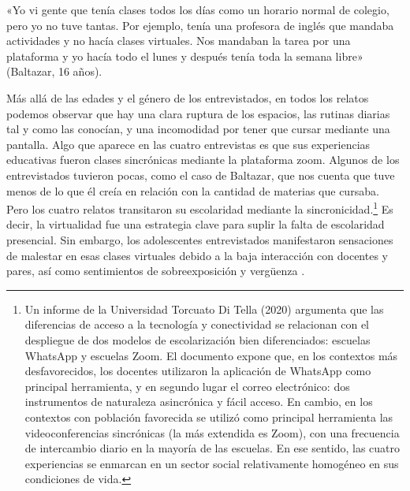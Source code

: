 \begin{refsection}
\begin{gbcita}
«Yo vi gente que tenía clases todos los días como un horario normal de colegio, pero yo no tuve tantas. Por ejemplo, tenía una profesora de inglés que mandaba actividades y no hacía clases virtuales. Nos mandaban la tarea por una plataforma y yo hacía todo el lunes y después tenía toda la semana libre» (Baltazar, 16 años).

\end{gbcita}

Más allá de las edades y el género de los entrevistados, en todos los relatos podemos observar que hay una clara ruptura de los espacios, las rutinas diarias tal y como las conocían, y una incomodidad por tener que cursar mediante una pantalla. Algo que aparece en las cuatro entrevistas es que sus experiencias educativas fueron clases sincrónicas mediante la plataforma zoom. Algunos de los entrevistados tuvieron pocas, como el caso de Baltazar, que nos cuenta que tuve menos de lo que él creía en relación con la cantidad de materias que cursaba. Pero los cuatro relatos transitaron su escolaridad mediante la sincronicidad.\footnote{Un informe de la Universidad Torcuato Di Tella (2020) argumenta que
      las diferencias de acceso a la tecnología y conectividad se relacionan
      con el despliegue de dos modelos de escolarización bien diferenciados:
      escuelas WhatsApp y escuelas Zoom. El documento expone que, en los
      contextos más desfavorecidos, los docentes utilizaron la aplicación de
      WhatsApp como principal herramienta, y en segundo lugar el correo
      electrónico: dos instrumentos de naturaleza asincrónica y fácil
      acceso. En cambio, en los contextos con población favorecida se
      utilizó como principal herramienta las videoconferencias sincrónicas
      (la más extendida es Zoom), con una frecuencia de intercambio diario
      en la mayoría de las escuelas. En ese sentido, las cuatro experiencias
      se enmarcan en un sector social relativamente homogéneo en sus
      condiciones de vida.} Es decir, la virtualidad fue una estrategia clave para suplir la falta de escolaridad presencial. Sin embargo, los adolescentes entrevistados manifestaron sensaciones de malestar en esas clases virtuales debido a la baja interacción con docentes y pares, así como sentimientos de sobreexposición y vergüenza \protect\parencite{4233-MOGUILLANSKY2022}.


\end{refsection}
